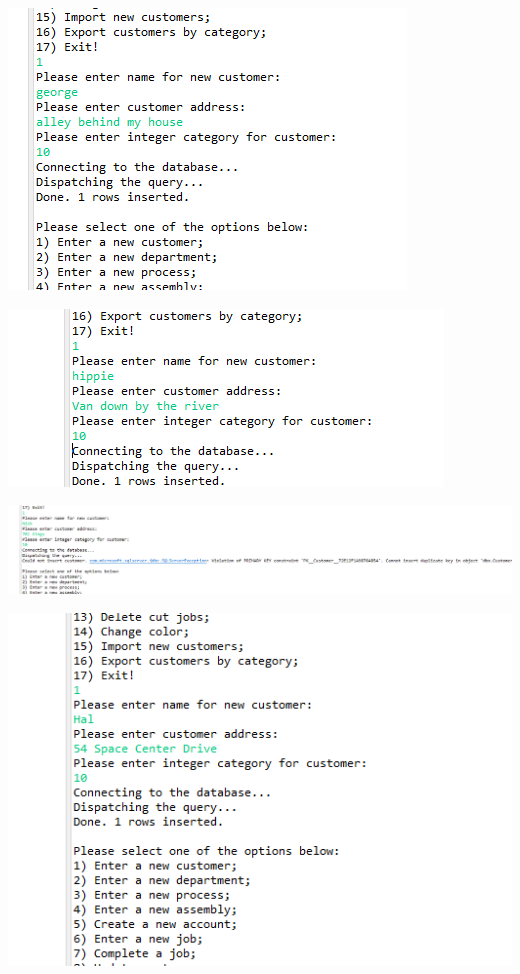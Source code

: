 \documentclass[11pt]{article}
\begin{document}
\includegraphics[width = \textwidth]{cust3.png}

\includegraphics[width = \textwidth]{cust4.png}

\includegraphics[width = \textwidth]{cust5.png}


\includegraphics[width = \textwidth]{insertCust4.png}
\end{document}
